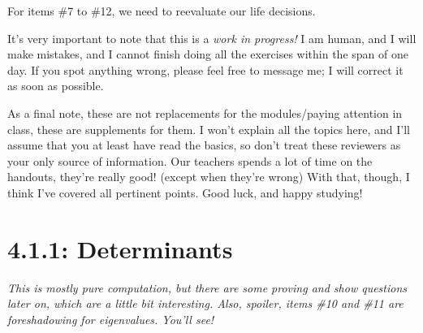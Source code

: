 \documentclass{article}
\begin{document}
    \colorbox{CornflowerBlue!50}{
    \begin{minipage}[c]{0.9\textwidth}
        \centering
        For items \#7 to \#12, we need to reevaluate our life decisions.
    \end{minipage}
    }\parindent=0pt \par 
It's very important to note that this is a \textit{work in progress!} I am human, and I will make mistakes, and I cannot finish doing all the exercises within the span of one day. If you spot anything wrong, 
please feel free to message me; I will correct it as soon as possible.\par
As a final note, these are not replacements for the modules/paying attention in class, these are supplements for them. I won't explain all the topics here, and I'll assume that you at least have 
read the basics, so don't treat these reviewers as your only source of information. Our teachers spends a lot of time on the handouts, they're really good! (except when they're wrong) With that, though, I think 
I've covered all pertinent points. Good luck, and happy studying!
\pagebreak 

\section*{4.1.1: Determinants }
\textit{This is mostly pure computation, but there are some proving and show questions later on, which are a little bit interesting. Also, spoiler, items \#10 and \#11 are foreshadowing for 
eigenvalues. You'll see!}
\end{document}
